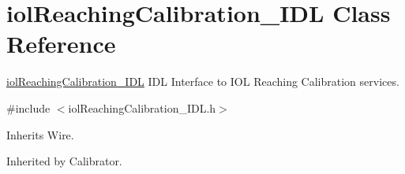 \section{iol\+Reaching\+Calibration\+\_\+\+I\+DL Class Reference}
\label{classiolReachingCalibration__IDL}


\mbox{\hyperlink{classiolReachingCalibration__IDL}{iol\+Reaching\+Calibration\+\_\+\+I\+DL}} I\+DL Interface to I\+OL Reaching Calibration services.  




{\ttfamily \#include $<$iol\+Reaching\+Calibration\+\_\+\+I\+D\+L.\+h$>$}



Inherits Wire.



Inherited by Calibrator.

